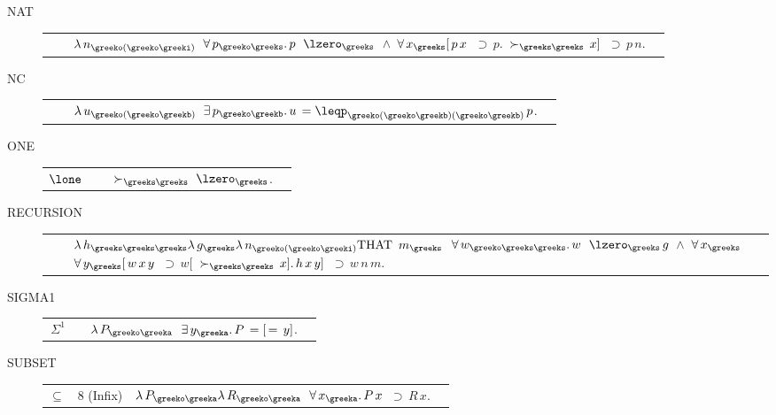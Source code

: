\begin{description}
\item[NAT]  \begin{tabular}{l l l l}
&&\texttt{$ \lambda \,n_{\greeko(\greeko\greeki)} $ $\forall \,p_{\greeko\greeks} . \,p $ $\lzero_{\greeks} $ $\land $ $\forall \,x_{\greeks} [ \,p \,x $ $\supset \,p . $ $\succ_{\greeks\greeks} \,x ] $ $\supset \,p \,n$}. \\ 
\end{tabular}

\item[NC]  \begin{tabular}{l l l l}
&&\texttt{$ \lambda \,u_{\greeko(\greeko\greekb)} $ $\exists \,p_{\greeko\greekb} . \,u \,= \leqp_{\greeko(\greeko\greekb)(\greeko\greekb)} \,p$}. \\ 
\end{tabular}

\item[ONE]  \begin{tabular}{l l l l}
\texttt{$\lone$}&&\texttt{$ $ $\succ_{\greeks\greeks} $ $\lzero_{\greeks}$}. \\ 
\end{tabular}

\item[RECURSION]  \begin{tabular}{l l l l}
&&\texttt{$ \lambda \,h_{\greeks\greeks\greeks} \lambda \,g_{\greeks} \lambda \,n_{\greeko(\greeko\greeki)} \hbox{THAT } \,m_{\greeks} $ $\forall \,w_{\greeko\greeks\greeks} . \,w $ $\lzero_{\greeks} \,g $ $\land $ $\forall \,x_{\greeks} $ $\forall \,y_{\greeks} [ \,w \,x \,y $ $\supset \,w [ $ $\succ_{\greeks\greeks} \,x ] . \,h \,x \,y ] $ $\supset \,w \,n \,m$}. \\ 
\end{tabular}

\item[SIGMA1]  \begin{tabular}{l l l l}
\texttt{$\,\Sigma^{1}$}&&\texttt{$ \lambda \,P_{\greeko\greeka} $ $\exists \,y_{\greeka} . \,P \,= [ \,= \,y ]$}. \\ 
\end{tabular}

\item[SUBSET]  \begin{tabular}{l l l l}
\texttt{$\subseteq$}&8 (Infix)&\texttt{$ \lambda \,P_{\greeko\greeka} \lambda \,R_{\greeko\greeka} $ $\forall \,x_{\greeka} . \,P \,x $ $\supset \,R \,x$}. \\ 
\end{tabular}


\end{description}

